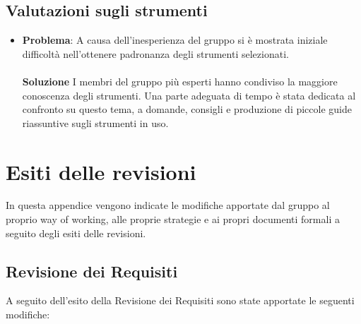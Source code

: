 \documentclass[openany,12pt,a4paper]{report}
\begin{document}
\section{Valutazioni sugli strumenti}

\begin{itemize}
	\item \textbf{Problema}: A causa dell'inesperienza del gruppo si è mostrata iniziale difficoltà nell'ottenere padronanza degli strumenti selezionati. \\ \\
	\textbf{Soluzione} I membri del gruppo più esperti hanno condiviso la maggiore conoscenza degli strumenti. Una parte adeguata di tempo è stata dedicata al confronto su questo tema, a domande, consigli e produzione di piccole guide riassuntive sugli strumenti in uso.
\end{itemize}

\chapter{Esiti delle revisioni}

In questa appendice vengono indicate le modifiche apportate dal gruppo al proprio way of working, alle proprie strategie e ai propri documenti formali a seguito degli esiti delle revisioni.

\section{Revisione dei Requisiti}

A seguito dell'esito della Revisione dei Requisiti sono state apportate le seguenti modifiche:
\end{document}
